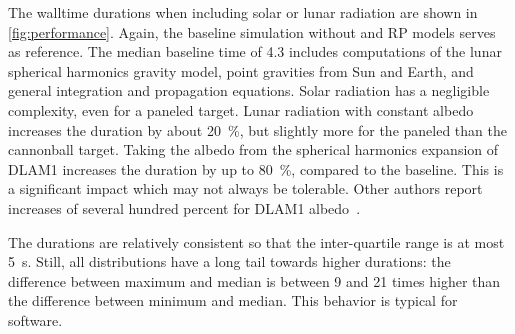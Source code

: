 The walltime durations when including solar or lunar radiation are shown in \cref{fig:performance}. Again, the baseline simulation without and \gls{RP} models serves as reference. The median baseline time of \qty{4.3}{\min} includes computations of the lunar spherical harmonics gravity model, point gravities from Sun and Earth, and general integration and propagation equations. Solar radiation has a negligible complexity, even for a paneled target. Lunar radiation with constant albedo increases the duration by about \qty{20}{\percent}, but slightly more for the paneled than the cannonball target. Taking the albedo from the spherical harmonics expansion of \gls{DLAM1} increases the duration by up to \qty{80}{\percent}, compared to the baseline. This is a significant impact which may not always be tolerable. Other authors report increases of several hundred percent for \gls{DLAM1} albedo~\cite{Nicholson2010}.

The durations are relatively consistent so that the inter-quartile range is at most \qty{5}{\s}. Still, all distributions have a long tail towards higher durations: the difference between maximum and median is between 9 and 21 times higher than the difference between minimum and median. This behavior is typical for software.
